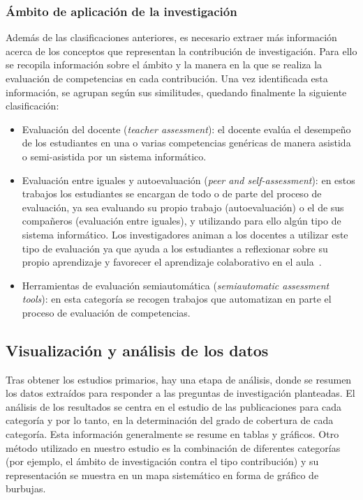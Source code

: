 \subsubsection*{Ámbito de aplicación de la investigación}
Además de las clasificaciones anteriores, es necesario extraer más información acerca de los conceptos que representan la contribución de investigación. Para ello se recopila información sobre el ámbito y la manera en la que se realiza la evaluación de competencias en cada contribución. Una vez identificada esta información, se agrupan según sus similitudes, quedando finalmente la siguiente clasificación:
\begin{itemize}
\item Evaluación del docente (\emph{teacher assessment}): el docente evalúa el desempeño de los estudiantes en una o varias competencias genéricas de manera asistida o semi-asistida por un sistema informático.
\item Evaluación entre iguales y autoevaluación (\emph{peer and self-assessment}): en estos trabajos los estudiantes se encargan de todo o de parte del proceso de evaluación, ya sea evaluando su propio trabajo (autoevaluación) o el de sus compañeros (evaluación entre iguales), y utilizando para ello algún tipo de sistema informático. Los investigadores animan a los docentes a utilizar este tipo de evaluación ya que ayuda a los estudiantes a reflexionar sobre su propio aprendizaje y favorecer el aprendizaje colaborativo en el aula~\cite{chen2010implementation}.
\item Herramientas de evaluación semiautomática (\emph{semiautomatic assessment tools}): en esta categoría se recogen trabajos que automatizan en parte el proceso de evaluación de competencias.
\end{itemize}

\subsection{Visualización y análisis de los datos}
Tras obtener los estudios primarios, hay una etapa de análisis, donde se resumen los datos extraídos para responder a las preguntas de investigación planteadas. El análisis de los resultados se centra en el estudio de las publicaciones para cada categoría y por lo tanto, en la determinación del grado de cobertura de cada categoría. Esta información generalmente se resume en tablas y gráficos. Otro método utilizado en nuestro estudio es la combinación de diferentes categorías (por ejemplo, el ámbito de investigación contra el tipo contribución) y su representación se muestra en un mapa sistemático en forma de gráfico de burbujas.

